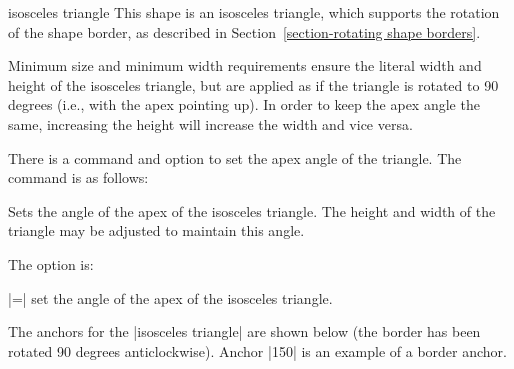 \begin{shape}{isosceles triangle}
	This shape is an isosceles triangle, which supports the rotation of 
	the shape border, as described in 
	Section~\ref{section-rotating shape borders}.
	
	Minimum size and minimum width requirements ensure the literal width 
	and height of the isosceles triangle, but are applied as if the 
	triangle is rotated to 90 degrees (i.e., with the apex pointing up). 
	In order to keep the apex angle the same, increasing the height will 
	increase the width and vice versa. 
   
\begin{codeexample}[]
\end{codeexample}	

	There is a \pgfname{} command and \tikzname{} option to set the 
  	apex angle of the triangle. The \pgfname{} command is as follows:
    
  \begin{command}{\pgfsetisoscelestriangleapexangle{}}
    Sets the angle of the apex of the isosceles triangle. The height
    and width of the triangle may be adjusted to maintain this
    angle.
  \end{command}
  
  The \tikzname{} option is:
  
  \begin{itemize}
    |=|
    set the angle of the apex of the isosceles triangle.
   \end{itemize}
 
	The anchors for the |isosceles triangle| are shown below (the border 
	has been rotated 90 degrees anticlockwise). Anchor |150| is an
	example of a border anchor. 
\begin{codeexample}[]
\Huge
{}
\end{codeexample} 


\end{shape}
